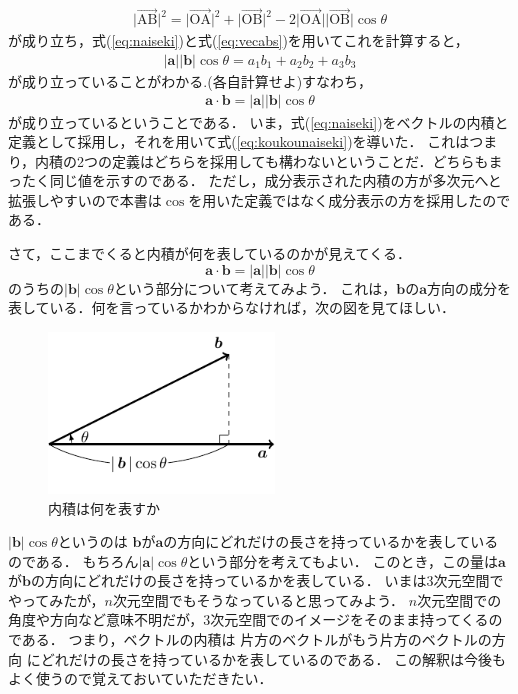 \begin{align*}
\lvert \overrightarrow{\mathrm{AB}} \rvert^2 = 
\lvert \overrightarrow{\mathrm{OA}} \rvert^ 2 + \lvert \overrightarrow{\mathrm{OB}} \rvert^ 2
-2 \lvert \overrightarrow{\mathrm{OA}} \rvert \lvert \overrightarrow{\mathrm{OB}} \rvert \cos \theta
\end{align*}
が成り立ち，式(\ref{eq:naiseki})と式(\ref{eq:vecabs})を用いてこれを計算すると，
\begin{align*}
\lvert \bm{a} \rvert \lvert \bm{b} \rvert \cos \theta = a_1 b_1 + a_2 b_2 + a_3 b_3
\end{align*}
が成り立っていることがわかる.(各自計算せよ)すなわち，
\begin{align}
\bm{a} \cdot \bm{b} =\lvert \bm{a} \rvert \lvert \bm{b} \rvert \cos \theta 
\label{eq:koukounaiseki}
\end{align}
が成り立っているということである．
いま，式(\ref{eq:naiseki})をベクトルの内積と定義として採用し，それを用いて式(\ref{eq:koukounaiseki})を導いた．
これはつまり，内積の2つの定義はどちらを採用しても構わないということだ．どちらもまったく同じ値を示すのである．
ただし，成分表示された内積の方が多次元へと拡張しやすいので本書は$\cos$を用いた定義ではなく成分表示の方を採用したのである．

さて，ここまでくると内積が何を表しているのかが見えてくる．
$$
\bm{a} \cdot \bm{b} = \lvert \bm{a} \rvert \lvert \bm{b} \rvert \cos \theta 
$$
のうちの$\lvert \bm{b} \rvert \cos \theta$という部分について考えてみよう．
これは，$\bm{b}$の$\bm{a}$方向の成分を表している．何を言っているかわからなければ，次の図を見てほしい．
\begin{figure}[h]
 \centering
 \includegraphics[width=6cm]{picture/vecter1.pdf}
 \caption{内積は何を表すか}
\end{figure}

$\lvert \bm{b} \rvert \cos \theta$というのは
$\bm{b}$が$\bm{a}$の方向にどれだけの長さを持っているかを表しているのである．
もちろん$\lvert \bm{a} \rvert \cos \theta$という部分を考えてもよい．
このとき，この量は$\bm{a}$が$\bm{b}$の方向にどれだけの長さを持っているかを表している．
いまは3次元空間でやってみたが，$n$次元空間でもそうなっていると思ってみよう．
$n$次元空間での角度や方向など意味不明だが，3次元空間でのイメージをそのまま持ってくるのである．
つまり，ベクトルの内積は
片方のベクトルがもう片方のベクトルの方向
にどれだけの長さを持っているかを表しているのである．
この解釈は今後もよく使うので覚えておいていただきたい．


